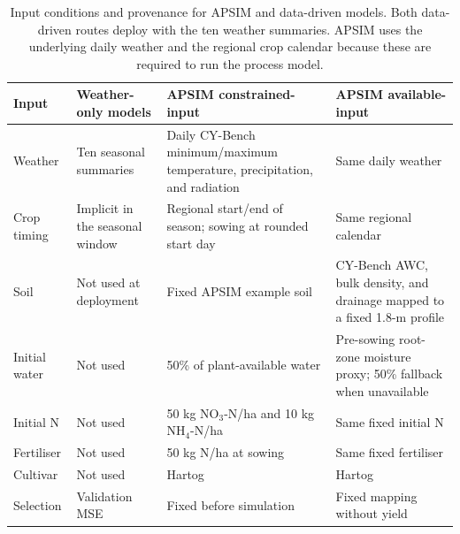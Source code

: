 \begin{table}[tb]
\centering
\caption{Input conditions and provenance for APSIM and data-driven models. Both data-driven routes deploy with the ten weather summaries. APSIM uses the underlying daily weather and the regional crop calendar because these are required to run the process model.}
\label{tab:apsim-inputs}
\small
\setlength{\tabcolsep}{3pt}
\begin{tabular}{p{}p{}p{}p{}}
\toprule
Input & Weather-only models & APSIM constrained-input & APSIM available-input\\
\midrule
Weather & Ten seasonal summaries & Daily CY-Bench minimum/maximum temperature, precipitation, and radiation & Same daily weather\\
Crop timing & Implicit in the seasonal window & Regional start/end of season; sowing at rounded start day & Same regional calendar\\
Soil & Not used at deployment & Fixed APSIM example soil & CY-Bench AWC, bulk density, and drainage mapped to a fixed 1.8-m profile\\
Initial water & Not used & 50\% of plant-available water & Pre-sowing root-zone moisture proxy; 50\% fallback when unavailable\\
Initial N & Not used & 50 kg NO$_3$-N/ha and 10 kg NH$_4$-N/ha & Same fixed initial N\\
Fertiliser & Not used & 50 kg N/ha at sowing & Same fixed fertiliser\\
Cultivar & Not used & Hartog & Hartog\\
Selection & Validation MSE & Fixed before simulation & Fixed mapping without yield\\
\bottomrule
\end{tabular}
\end{table}
